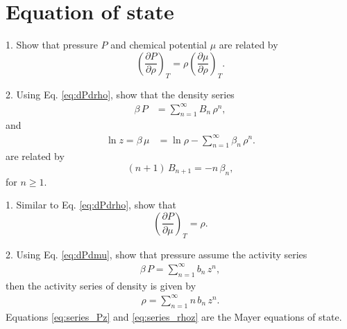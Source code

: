 \documentclass{book}
\begin{document}



\section{Equation of state}






1. Show that pressure $P$ and chemical potential $\mu$ are related by
\begin{equation}
  \left(
    \frac{ \partial P } { \partial \rho }
  \right)_T
=
  \rho
  \left(
    \frac{ \partial \mu } { \partial \rho }
  \right)_T.
  \label{eq:dPdrho}
\end{equation}



2. Using Eq. \eqref{eq:dPdrho}, show that the density series
\begin{align}
  \beta \, P
&=
  \sum_{n = 1}^\infty B_n \, \rho^n,
  \label{eq:series_Prho}
\end{align}
and
\begin{align}
  \ln z = \beta \, \mu
&=
  \ln \rho - \sum_{n = 1}^\infty \beta_n \, \rho^n.
  \label{eq:series_murho}
\end{align}
are related by
\[
  (n + 1) \, B_{n+1} = -n \, \beta_n,
\]
for $n \ge 1$.





1. Similar to Eq. \eqref{eq:dPdrho}, show that
\begin{equation}
  \left(
    \frac{ \partial P } { \partial \mu }
  \right)_T
=
  \rho.
  \label{eq:dPdmu}
\end{equation}


2. Using Eq. \eqref{eq:dPdmu}, show that pressure assume the activity series
\begin{align}
  \beta \, P = \sum_{n = 1}^\infty b_n \, z^n,
  \label{eq:series_Pz}
\end{align}
then the activity series of density is given by
\begin{align}
  \rho = \sum_{n = 1}^\infty n \, b_n \, z^n.
  \label{eq:series_rhoz}
\end{align}
Equations \eqref{eq:series_Pz} and \eqref{eq:series_rhoz}
are the Mayer equations of state.
\end{document}
